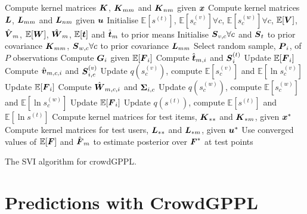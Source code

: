\begin{algorithm}[h]
 \nl Compute kernel matrices $\boldsymbol K$, $\boldsymbol K_{mm}$ and $\boldsymbol K_{nm}$ given $\boldsymbol x$\;
 \nl Compute kernel matrices $\boldsymbol L$, $\boldsymbol L_{mm}$ and $\boldsymbol L_{nm}$ given $\boldsymbol u$\;
 \nl Initialise $\mathbb{E}\left[s^{(t)}\right]$, $\mathbb{E}\left[s^{(v)}_c\right]\forall c$, 
 $\mathbb{E}\left[s^{(w)}_c\right]\forall c$, $\mathbb{E}[\boldsymbol V]$, $\hat{\boldsymbol V}_m$,
 $\mathbb{E}[\boldsymbol W]$, $\hat{\boldsymbol W}_m$,
  $\mathbb{E}[\boldsymbol t]$ and $\hat{\boldsymbol t}_m$ 
  to prior means\;
 \nl Initialise $\boldsymbol S_{v,c}\forall c$ and $\boldsymbol S_t$ to prior covariance $\boldsymbol K_{mm}$,
  $\boldsymbol S_{w,c}\forall c$ to prior covariance $\boldsymbol L_{mm}$\;
 {
 \nl Select random sample, $\boldsymbol P_i$, of $P$ observations
  {
  \nl Compute $\boldsymbol G_i$ given $\mathbb{E}[\boldsymbol F_i]$ \;
  \nl Compute $\hat{\boldsymbol t}_{m,i}$ and $\boldsymbol S_{i}^{(t)}$ \;
  {
    \nl Update $\mathbb{E}[\boldsymbol F_i]$ \;
    \nl Compute $\hat{\boldsymbol v}_{m,c,i}$ and $\boldsymbol S_{i,c}^{(v)}$ \;
    \nl Update $q\left(s^{(v)}_c\right)$, compute $\mathbb{E}\left[s^{(v)}_c\right]$ and 
    $\mathbb{E}\left[\ln s^{(v)}_c\right]$\; 
    \nl Update $\mathbb{E}[\boldsymbol F_i]$ \;
    \nl Compute $\hat{\boldsymbol W}_{m,c,i}$ and $\boldsymbol \Sigma_{i,c}$ \;    
    \nl Update $q\left(s^{(w)}_c\right)$, compute $\mathbb{E}\left[s^{(w)}_c\right]$ 
    and $\mathbb{E}\left[\ln s^{(w)}_c\right]$\;
  }
  \nl Update $\mathbb{E}[\boldsymbol F_i]$ \;
 }
 \nl Update $q\left(s^{(t)}\right)$, compute $\mathbb{E}\left[s^{(t)}\right]$ and
 $\mathbb{E}\left[\ln s^{(t)}\right]$ \;
 }
\nl Compute kernel matrices for test items, $\boldsymbol K_{**}$ and $\boldsymbol K_{*m}$, given $\boldsymbol x^*$ \;
\nl Compute kernel matrices for test users, $\boldsymbol L_{**}$ and $\boldsymbol L_{*m}$, given $\boldsymbol u^*$ \;
\nl Use converged values of $\mathbb{E}[\boldsymbol F]$ and $\hat{\boldsymbol F}_m$ to estimate
posterior over $\boldsymbol F^*$ at test points \;
\vspace{0.5cm}
\caption{The SVI algorithm for crowdGPPL.}
\label{al:crowdgppl}
\end{algorithm}

\section{Predictions with CrowdGPPL}
\label{sec:predictions}

